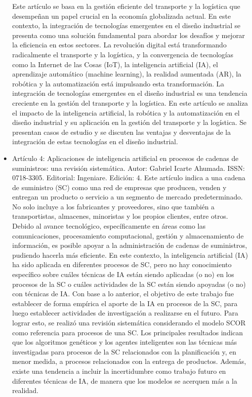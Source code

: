 \documentclass[conference]{IEEEtran}
\begin{document}
\begin{itemize}
		Este artículo se basa en la gestión eficiente del transporte y la logística que desempeñan un papel crucial en la economía globalizada actual. En este contexto, la integración de tecnologías emergentes en el diseño industrial se presenta como una solución fundamental para abordar los desafíos y mejorar la eficiencia en estos sectores. La revolución digital está transformando radicalmente el transporte y la logística, y la convergencia de tecnologías como la Internet de las Cosas (IoT), la inteligencia artificial (IA), el aprendizaje automático (machine learning), la realidad aumentada (AR), la robótica y la automatización está impulsando esta transformación. La integración de tecnologías emergentes en el diseño industrial es una tendencia creciente en la gestión del transporte y la logística. En este artículo se analiza el impacto de la inteligencia artificial, la robótica y la automatización en el diseño industrial y su aplicación en la gestión del transporte y la logística. Se presentan casos de estudio y se discuten las ventajas y desventajas de la integración de estas tecnologías en el diseño industrial.
		\item Artículo 4: Aplicaciones de inteligencia artificial en procesos de cadenas de suministros: una revisión sistemática. Autor: Gabriel Icarte Ahumada. ISSN: 0718-3305. Editorial: Ingeniare. Edición: 4. 
		Este artículo indica a una cadena de suministro (SC) como una red de empresas que producen, venden y entregan un producto o servicio a un segmento de mercado predeterminado. No solo incluye a los fabricantes y proveedores, sino que también a transportistas, almacenes, minoristas y los propios clientes, entre otros. Debido al avance tecnológico, específicamente en áreas como las comunicaciones, procesamiento computacional, gestión y almacenamiento de información, es posible apoyar a la administración de cadenas de suministros, pudiendo hacerla más eficiente. En este contexto, la inteligencia artificial (IA) ha sido aplicada en diferentes procesos de SC, pero no hay conocimiento específico sobre cuáles técnicas de IA están siendo aplicadas (o no) en los procesos de la SC o cuáles actividades de la SC están siendo apoyadas (o no) con técnicas de IA. Con base a lo anterior, el objetivo de este trabajo fue establecer de forma empírica el aporte de la IA en procesos de la SC, para luego establecer actividades de investigación a realizarse en el futuro. Para lograr esto, se realizó una revisión sistemática considerando el modelo SCOR como referencia para procesos de una SC. Los principales resultados indican que los algoritmos genéticos y los agentes inteligentes son las técnicas más investigadas para procesos de la SC relacionados con la planificación y, en menor medida, a procesos relacionados con la entrega de productos. Además, existe una tendencia a incluir la incertidumbre como trabajo futuro en diferentes técnicas de IA, de manera que los modelos se acerquen más a la realidad.

\end{itemize}
\end{document}
